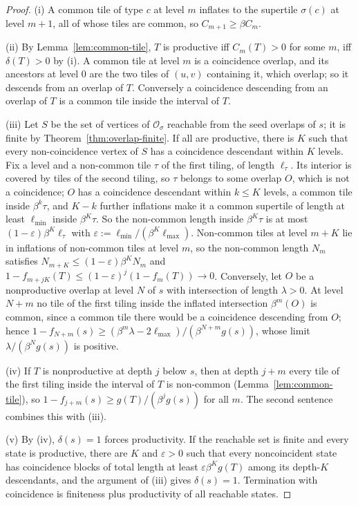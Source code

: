 \documentclass[11pt]{amsart}
\theoremstyle{plain}
\theoremstyle{definition}
\theoremstyle{remark}
\begin{document}
\begin{proof}
(i) A common tile of type $c$ at level $m$ inflates to the supertile $\sigma(c)$ at level $m+1$, all of whose tiles are common, so $C_{m+1}\ge\beta C_m$.

(ii) By Lemma~\ref{lem:common-tile}, $T$ is productive iff $C_m(T)>0$ for some $m$, iff $\delta(T)>0$ by (i). A common tile at level $m$ is a coincidence overlap, and its ancestors at level $0$ are the two tiles of $(u,v)$ containing it, which overlap; so it descends from an overlap of $T$. Conversely a coincidence descending from an overlap of $T$ is a common tile inside the interval of $T$.

(iii) Let $S$ be the set of vertices of $\mathcal O_\sigma$ reachable from the seed overlaps of $s$; it is finite by Theorem~\ref{thm:overlap-finite}. If all are productive, there is $K$ such that every non-coincidence vertex of $S$ has a coincidence descendant within $K$ levels. Fix a level and a non-common tile $\tau$ of the first tiling, of length $\ell_\tau$. Its interior is covered by tiles of the second tiling, so $\tau$ belongs to some overlap $O$, which is not a coincidence; $O$ has a coincidence descendant within $k\le K$ levels, a common tile inside $\beta^k\tau$, and $K-k$ further inflations make it a common supertile of length at least $\ell_{\min}$ inside $\beta^K\tau$. So the non-common length inside $\beta^K\tau$ is at most $(1-\varepsilon)\beta^K\ell_\tau$ with $\varepsilon:=\ell_{\min}/(\beta^K\ell_{\max})$. Non-common tiles at level $m+K$ lie in inflations of non-common tiles at level $m$, so the non-common length $N_m$ satisfies $N_{m+K}\le(1-\varepsilon)\beta^KN_m$ and $1-f_{m+jK}(T)\le(1-\varepsilon)^j(1-f_m(T))\to0$. Conversely, let $O$ be a nonproductive overlap at level $N$ of $s$ with intersection of length $\lambda>0$. At level $N+m$ no tile of the first tiling inside the inflated intersection $\beta^m(O)$ is common, since a common tile there would be a coincidence descending from $O$; hence $1-f_{N+m}(s)\ge(\beta^m\lambda-2\ell_{\max})/(\beta^{N+m}g(s))$, whose limit $\lambda/(\beta^Ng(s))$ is positive.

(iv) If $T$ is nonproductive at depth $j$ below $s$, then at depth $j+m$ every tile of the first tiling inside the interval of $T$ is non-common (Lemma~\ref{lem:common-tile}), so $1-f_{j+m}(s)\ge g(T)/(\beta^jg(s))$ for all $m$. The second sentence combines this with (iii).

(v) By (iv), $\delta(s)=1$ forces productivity. If the reachable set is finite and every state is productive, there are $K$ and $\varepsilon>0$ such that every noncoincident state has coincidence blocks of total length at least $\varepsilon\beta^Kg(T)$ among its depth-$K$ descendants, and the argument of (iii) gives $\delta(s)=1$. Termination with coincidence is finiteness plus productivity of all reachable states.
\end{proof}
\end{document}
